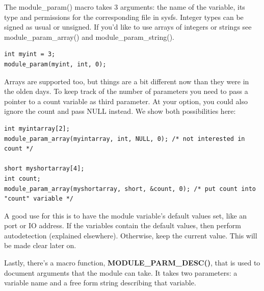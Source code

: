 \documentclass[11pt]{article}
\begin{document}
The module\_param() macro takes 3 arguments: the name of the variable, its type and permissions for the corresponding file in sysfs. Integer types can be signed as usual or unsigned. If you'd like to use arrays of integers or strings see module\_param\_array() and module\_param\_string().

\begin{verbatim}
int myint = 3;
module_param(myint, int, 0);
\end{verbatim}

Arrays are supported too, but things are a bit different now than they were in the olden days. To keep track of the number of parameters you need to pass a pointer to a count variable as third parameter. At your option, you could also ignore the count and pass NULL instead. We show both possibilities here:

\begin{verbatim}
int myintarray[2];
module_param_array(myintarray, int, NULL, 0); /* not interested in count */

short myshortarray[4];
int count;
module_param_array(myshortarray, short, &count, 0); /* put count into "count" variable */
\end{verbatim}

A good use for this is to have the module variable's default values set, like an port or IO address. If the variables contain the default values, then perform autodetection (explained elsewhere). Otherwise, keep the current value. This will be made clear later on.

Lastly, there's a macro function, \textbf{MODULE\_PARM\_DESC()}, that is used to document arguments that the module can take. It takes two parameters: a variable name and a free form string describing that variable.
\end{document}

